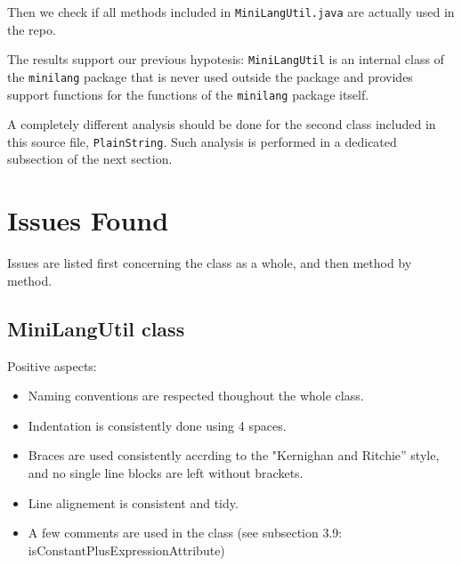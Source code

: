 \documentclass[11pt]{article} %
\begin{document}


Then we check if all methods included in \texttt{MiniLangUtil.java} are actually used in the repo.



The results support our previous hypotesis: \texttt{MiniLangUtil} is an internal class of the \texttt{minilang} package that is never used outside the package and provides support functions for the functions of the \texttt{minilang} package itself.

A completely different analysis should be done for the second class included in this source file, \texttt{PlainString}. Such analysis is performed in a dedicated subsection of the next section.


\section{Issues Found}
Issues are listed first concerning the class as a whole, and then method by method.

\subsection{MiniLangUtil class}

Positive aspects:
\begin{itemize}[noitemsep]
	\item Naming conventions are respected thoughout the whole class.
	\item Indentation is consistently done using 4 spaces.
	\item Braces are used consistently accrding to the "Kernighan and Ritchie” style, and no single line blocks are left without brackets.
	\item Line alignement is consistent and tidy.
	\item A few comments are used in the class (see subsection 3.9: isConstantPlusExpressionAttribute)
\end{itemize}
\end{document}

